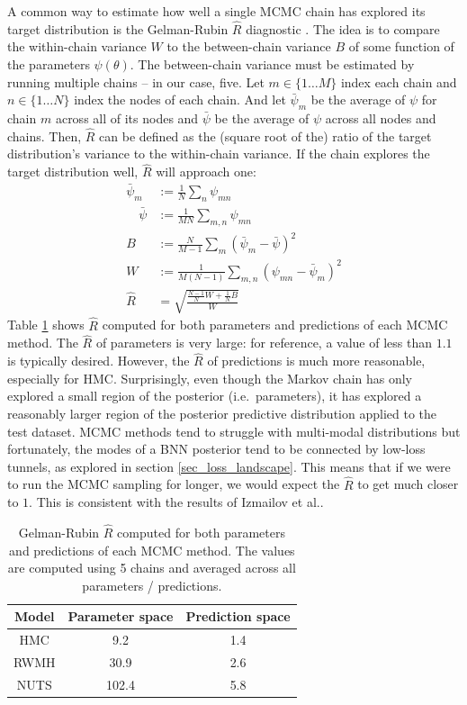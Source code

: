 \documentclass[12pt]{article}
\begin{document}
A common way to estimate how well a single MCMC chain has explored its target distribution is the Gelman-Rubin $\hat{R}$ diagnostic \cite{r_hat}. The idea is to compare the within-chain variance $W$ to the between-chain variance $B$ of some function of the parameters $\psi (\theta)$. The between-chain variance must be estimated by running multiple chains -- in our case, five. Let $m \in \{1 \ldots M\}$ index each chain and $n \in \{1 \ldots N\}$ index the nodes of each chain. And let $\bar{\psi}_m$ be the average of $\psi$ for chain $m$ across all of its nodes and $\bar{\psi}$ be the average of $\psi$ across all nodes and chains. Then, $\hat{R}$ can be defined as the (square root of the) ratio of the target distribution's variance to the within-chain variance. If the chain explores the target distribution well, $\hat{R}$ will approach one:
\begin{align}
\bar{\psi}_m &:= \frac{1}{N} \sum_{n} \psi_{m n} \\
\quad \bar{\psi} &:= \frac{1}{M N} \sum_{m, n} \psi_{m n} \\
B &:= \frac{N}{M-1} \sum_{m} (\bar{\psi}_m-\bar{\psi})^2 \\
W &:= \frac{1}{M(N-1)} \sum_{m, n} (\psi_{m n}-\bar{\psi}_m)^{2} \\
\hat{R} &= \sqrt{\frac{\frac{N-1}{N} W+\frac{1}{N} B}{W}}
\end{align}
Table \ref{table_r_hat} shows $\hat{R}$ computed for both parameters and predictions of each MCMC method. The $\hat{R}$ of parameters is very large: for reference, a value of less than $1.1$ is typically desired. However, the $\hat{R}$ of predictions is much more reasonable, especially for HMC. Surprisingly, even though the Markov chain has only explored a small region of the posterior (i.e.\ parameters), it has explored a reasonably larger region of the posterior predictive distribution applied to the test dataset. MCMC methods tend to struggle with multi-modal distributions but fortunately, the modes of a BNN posterior tend to be connected by low-loss tunnels, as explored in section \ref{sec_loss_landscape}. This means that if we were to run the MCMC sampling for longer, we would expect the $\hat{R}$ to get much closer to $1$. This is consistent with the results of Izmailov et al.\cite{bnn_posterior}.

\begin{table}[H]
\centering
\begin{tabular}{|c|c|c|}
\hline
Model & Parameter space & Prediction space \\ \hline
HMC   & 9.2             & 1.4              \\ \hline
RWMH  & 30.9            & 2.6              \\ \hline
NUTS  & 102.4           & 5.8              \\ \hline
\end{tabular}
\caption{Gelman-Rubin $\hat{R}$ computed for both parameters and predictions of each MCMC method. The values are computed using 5 chains and averaged across all parameters / predictions.}
\label{table_r_hat}
\end{table}
\end{document}
